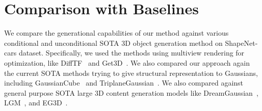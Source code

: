 \begin{table}[t]
\centering
\setlength{\tabcolsep}{0.75mm}
\renewcommand{\arraystretch}{1.2}
\caption{We compare the FID and KID of unconditional generation using the current SOTA methods on 20K randomly generated samples from each method and ours. We also compare our method against SOTA text-conditioned generation frameworks on CLIP Score for 10K generated objects from each method. 
}
\label{table:supp_unconditional} 
\vspace{-0.1cm}
\end{table}



\section{Comparison with Baselines}

We compare the generational capabilities of our method against various conditional and unconditional SOTA 3D object generation method on ShapeNet-cars dataset. Specifically, we used the methods using multiview rendering for optimization, like DiffTF~\cite{difftf2023} and Get3D~\cite{get3d2022}. We also compared our approach again the current SOTA methods trying to give structural representation to Gaussians, including GaussianCube~\cite{gaussiancube2024} and TriplaneGaussian~\cite{triplanemeetsgs2024}. We also compared against general purpose SOTA large 3D content generation models like DreamGaussian~\cite{dreamgaussian2023}, LGM~\cite{lgm2025}, and EG3D~\cite{eg3d2022}. 

